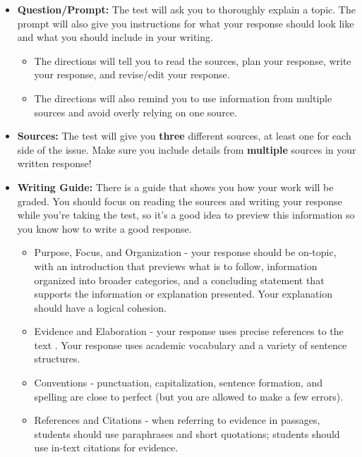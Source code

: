 \documentclass[12pt]{article}
\begin{document}
\vspace{1em}
\begin{tcolorbox}[colframe=black!60, colback=white, 
coltitle=black, colbacktitle=black!15, fonttitle=\bfseries\Large, 
title=What does the Writing Task Look Like?, halign title=center, left=10pt, right=10pt, top=10pt, bottom=15pt]

\begin{itemize}
    \item \textbf{Question/Prompt:} The test will ask you to thoroughly explain a topic. The prompt will also give you instructions for what your response should look like and what you should include in your writing.
    \begin{itemize}
        \item The directions will tell you to read the sources, plan your response, write your response, and revise/edit your response.
        \item The directions will also remind you to use information from multiple sources and avoid overly relying on one source.
    \end{itemize}
    \item \textbf{Sources:} The test will give you \textbf{three} different sources, at least one for each side of the issue. Make sure you include details from \textbf{multiple} sources in your written response!
    \item \textbf{Writing Guide:} There is a guide that shows you how your work will be graded. You should focus on reading the sources and writing your response while you're taking the test, so it's a good idea to preview this information so you know how to write a good response.
    \begin{itemize}
        \item Purpose, Focus, and Organization - your response should be on-topic, with an introduction that previews what is to follow, information organized into broader categories, and a concluding statement that supports the information or explanation presented. Your explanation should have a logical cohesion.
        \item Evidence and Elaboration - your response uses precise references to the text . Your response uses academic vocabulary and a variety of sentence structures. 
        \item Conventions - punctuation, capitalization, sentence formation, and spelling are close to perfect (but you are allowed to make a few errors).
        \item References and Citations - when referring to evidence in passages, students should use paraphrases and short quotations; students should use in-text citations for evidence.
        
    \end{itemize}
    \end{itemize}






\end{tcolorbox}
\end{document}
